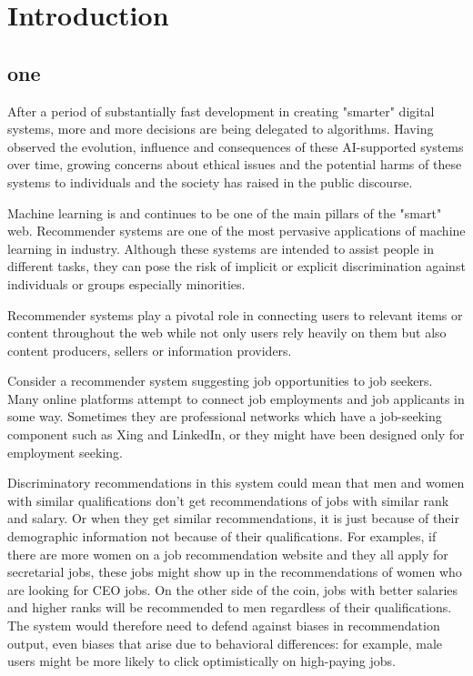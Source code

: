 \chapter{Introduction}
\label{introchap}


\section{one}

\begin{comment}
example 
problems that exist
approaches
\end{comment}


After a period of substantially fast development in creating "smarter" digital systems, more and more decisions are being delegated to algorithms. Having observed the evolution, influence and consequences of these AI-supported systems over time, growing concerns about ethical issues and the potential harms of these systems to individuals and the society has raised in the public discourse.

Machine learning is and continues to be one of the main pillars of the "smart" web. Recommender systems are one of the most pervasive applications of machine learning in industry. Although these systems are intended to assist people in different tasks, they can pose the risk of implicit or explicit discrimination against individuals or groups especially minorities.


Recommender systems play a pivotal role in connecting users to relevant items or content throughout the web while not only users rely heavily on them but also content producers, sellers or information providers. 

Consider a recommender system suggesting job opportunities to job seekers. Many online platforms attempt to connect job employments and job applicants in some way. Sometimes they are professional networks which have a job-seeking component such as Xing and LinkedIn, or they might have been designed only for employment seeking.

Discriminatory recommendations in this system could mean that men and women with similar qualifications don't get recommendations of jobs with similar rank and salary. Or when they get similar recommendations, it is just because of their demographic information not because of their qualifications. For examples, if there are more women on a job recommendation website and they all apply for secretarial jobs, these jobs might show up in the recommendations of women who are looking for CEO jobs. On the other side of the coin, jobs with better salaries and higher ranks will be recommended to men regardless of their qualifications. The system would therefore need to defend against biases in recommendation output, even biases that arise due to behavioral differences: for example, male users might be more likely to click optimistically on high-paying jobs. 



